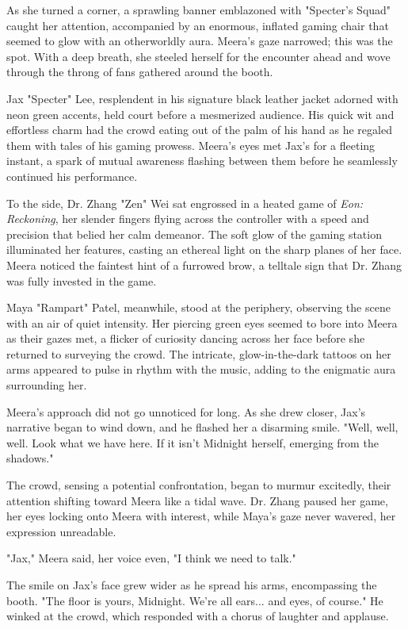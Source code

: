 \documentclass[12pt]{report}  %
\begin{document}
As she turned a corner, a sprawling banner emblazoned with "Specter's
Squad" caught her attention, accompanied by an enormous, inflated gaming
chair that seemed to glow with an otherworldly aura. Meera's gaze
narrowed; this was the spot. With a deep breath, she steeled herself for
the encounter ahead and wove through the throng of fans gathered around
the booth.

Jax "Specter" Lee, resplendent in his signature black leather jacket
adorned with neon green accents, held court before a mesmerized
audience. His quick wit and effortless charm had the crowd eating out of
the palm of his hand as he regaled them with tales of his gaming
prowess. Meera's eyes met Jax's for a fleeting instant, a spark of
mutual awareness flashing between them before he seamlessly continued
his performance.

To the side, Dr. Zhang "Zen" Wei sat engrossed in a heated game of
\emph{Eon: Reckoning}, her slender fingers flying across the controller
with a speed and precision that belied her calm demeanor. The soft glow
of the gaming station illuminated her features, casting an ethereal
light on the sharp planes of her face. Meera noticed the faintest hint
of a furrowed brow, a telltale sign that Dr. Zhang was fully invested in
the game.

Maya "Rampart" Patel, meanwhile, stood at the periphery, observing the
scene with an air of quiet intensity. Her piercing green eyes seemed to
bore into Meera as their gazes met, a flicker of curiosity dancing
across her face before she returned to surveying the crowd. The
intricate, glow-in-the-dark tattoos on her arms appeared to pulse in
rhythm with the music, adding to the enigmatic aura surrounding her.

Meera's approach did not go unnoticed for long. As she drew closer,
Jax's narrative began to wind down, and he flashed her a disarming
smile. "Well, well, well. Look what we have here. If it isn't Midnight
herself, emerging from the shadows."

The crowd, sensing a potential confrontation, began to murmur excitedly,
their attention shifting toward Meera like a tidal wave. Dr. Zhang
paused her game, her eyes locking onto Meera with interest, while Maya's
gaze never wavered, her expression unreadable.

"Jax," Meera said, her voice even, "I think we need to talk."

The smile on Jax's face grew wider as he spread his arms, encompassing
the booth. "The floor is yours, Midnight. We're all ears... and eyes, of
course." He winked at the crowd, which responded with a chorus of
laughter and applause.
\end{document}
